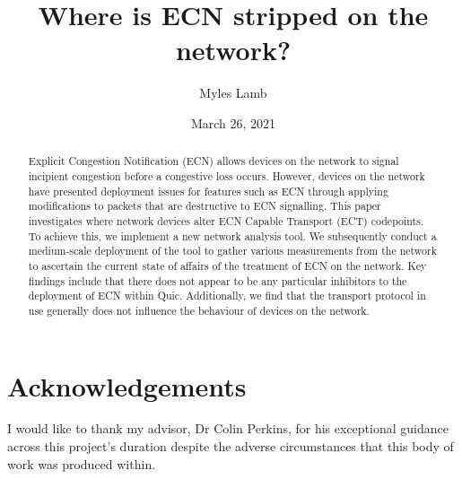 \documentclass{l4proj}
\begin{document}
\title{Where is ECN stripped on the network?}
\author{Myles Lamb}
\date{March 26, 2021}

\maketitle

\begin{abstract}
    
 Explicit Congestion Notification (ECN) allows devices on the network to signal incipient congestion before a congestive loss occurs. However, devices on the network have presented deployment issues for features such as ECN through applying modifications to packets that are destructive to ECN signalling. This paper investigates where network devices alter ECN Capable Transport (ECT) codepoints. To achieve this, we implement a new network analysis tool. We subsequently conduct a medium-scale deployment of the tool to gather various measurements from the network to ascertain the current state of affairs of the treatment of ECN on the network. Key findings include that there does not appear to be any particular inhibitors to the deployment of ECN within Quic. Additionally, we find that the transport protocol in use generally does not influence the behaviour of devices on the network.
    
\end{abstract}

\chapter*{Acknowledgements}

I would like to thank my advisor, Dr Colin Perkins, for his exceptional guidance across this project's duration despite the adverse circumstances that this body of work was produced within.


\def\consentname {Myles Lamb} %
\def\consentdate {26 March 2021} %

\educationalconsent


\tableofcontents
\end{document}
